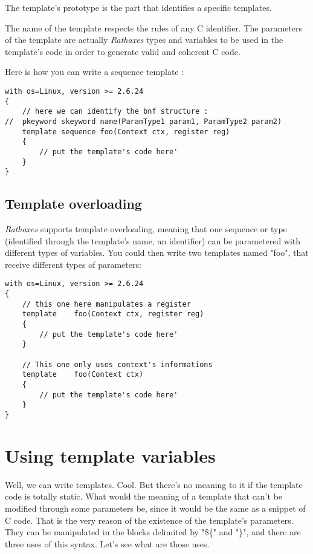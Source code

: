 \documentclass[american]{rtxreport}
\begin{document}
The template's prototype is the part that identifies a specific templates.

The name of the template respects the rules of any C identifier. The parameters
of the template are actually \emph{Rathaxes} types and variables to be used in
the template's code in order to generate valid and coherent C code.

Here is how you can write a sequence template :
\begin{lstlisting}
with os=Linux, version >= 2.6.24
{
    // here we can identify the bnf structure : 
//  pkeyword skeyword name(ParamType1 param1, ParamType2 param2)
    template sequence foo(Context ctx, register reg)
    {
        // put the template's code here'
    }
}
\end{lstlisting}

\subsection{Template overloading}

\emph{Rathaxes} supports template overloading, meaning that one sequence or
type (identified through the template's name, an identifier) can be parametered
with different types of variables. You could then write two templates named
"foo", that receive different types of parameters:

\begin{lstlisting}
with os=Linux, version >= 2.6.24
{
    // this one here manipulates a register
    template    foo(Context ctx, register reg)
    {
        // put the template's code here'
    }

    // This one only uses context's informations
    template    foo(Context ctx)
    {
        // put the template's code here'
    }
}
\end{lstlisting}


\section{Using template variables}

Well, we can write templates. Cool. But there's no meaning to it if the
template code is totally static. What would the meaning of a template that can't
be modified through some parameters be, since it would be the same as a snippet
of C code. That is the very reason of the existence of the template's
parameters. They can be manipulated in the blocks delimited by "\$\{" and "\}",
and there are three uses of this syntax. Let's see what are those uses.
\end{document}
